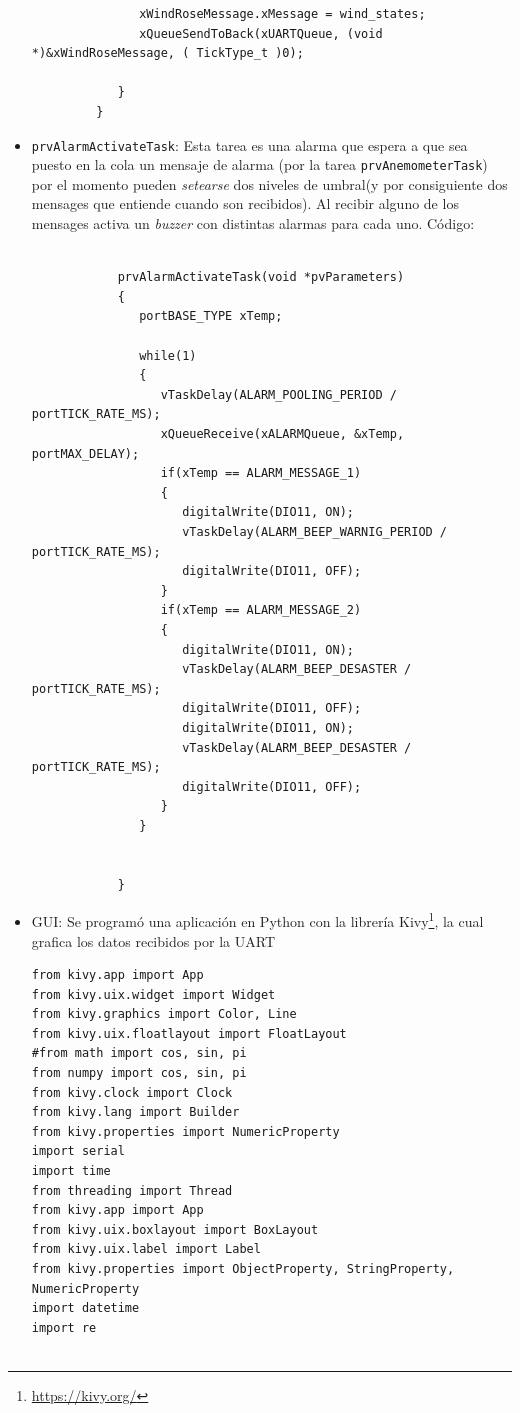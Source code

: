 \documentclass[10pt]{article}
\begin{document}
\begin{itemize}
\begin{verbatim}
               xWindRoseMessage.xMessage = wind_states;
               xQueueSendToBack(xUARTQueue, (void *)&xWindRoseMessage, ( TickType_t )0);

            }
         }
      \end{verbatim}
   \item \verb|prvAlarmActivateTask|: Esta tarea es una alarma que espera a que sea puesto en la cola un mensaje de alarma (por la tarea \verb|prvAnemometerTask|) por el momento pueden \textit{setearse} dos niveles de umbral(y por consiguiente dos mensages que entiende cuando son recibidos). Al recibir alguno de los mensages activa un \textit{buzzer} con distintas alarmas para cada uno. Código:
      \begin{verbatim}
         
            prvAlarmActivateTask(void *pvParameters)
            {
               portBASE_TYPE xTemp;

               while(1)
               {
                  vTaskDelay(ALARM_POOLING_PERIOD / portTICK_RATE_MS);
                  xQueueReceive(xALARMQueue, &xTemp,  portMAX_DELAY);
                  if(xTemp == ALARM_MESSAGE_1)
                  {
                     digitalWrite(DIO11, ON);
                     vTaskDelay(ALARM_BEEP_WARNIG_PERIOD / portTICK_RATE_MS);
                     digitalWrite(DIO11, OFF);
                  }
                  if(xTemp == ALARM_MESSAGE_2)
                  {
                     digitalWrite(DIO11, ON);
                     vTaskDelay(ALARM_BEEP_DESASTER / portTICK_RATE_MS);
                     digitalWrite(DIO11, OFF);
                     digitalWrite(DIO11, ON);
                     vTaskDelay(ALARM_BEEP_DESASTER / portTICK_RATE_MS);
                     digitalWrite(DIO11, OFF);
                  }
               }


            }
      \end{verbatim}
   \item GUI: Se programó una aplicación en Python con la librería Kivy\footnote{\url{https://kivy.org/}}, la cual grafica los datos recibidos por la UART
      \begin{verbatim}
from kivy.app import App
from kivy.uix.widget import Widget
from kivy.graphics import Color, Line
from kivy.uix.floatlayout import FloatLayout
#from math import cos, sin, pi
from numpy import cos, sin, pi
from kivy.clock import Clock
from kivy.lang import Builder
from kivy.properties import NumericProperty
import serial
import time
from threading import Thread
from kivy.app import App
from kivy.uix.boxlayout import BoxLayout
from kivy.uix.label import Label
from kivy.properties import ObjectProperty, StringProperty, NumericProperty
import datetime
import re


\end{verbatim}
\end{itemize}
\end{document}
